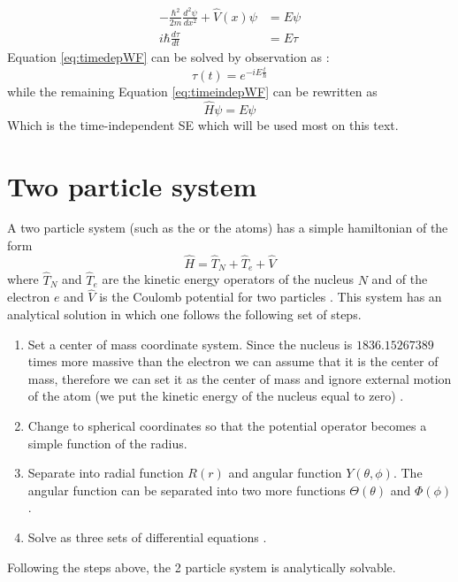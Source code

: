 \documentclass[../master_thesis.tex]{subfiles}
\begin{document}
\begin{subequations}
  \label{eq:sysSE}
  \begin{align}
    -\frac{\hbar^2}{2m}\frac{d^2\psi}{d x^2} + \hat{V}(x)\psi &= E\psi  \label{eq:timeindepWF}\\
    i\hbar\frac{d\tau}{d t} &= E\tau  \label{eq:timedepWF}
  \end{align}
\end{subequations}
Equation \ref{eq:timedepWF} can be solved by observation as \cite{Atkins:2011, Cohen:1973} :
\begin{equation}
  \tau(t) = e^{-iE\frac{t}{\hbar}}
\end{equation}
while the remaining Equation \ref{eq:timeindepWF} can be rewritten as
\begin{equation}
  \hat{H}\psi = E\psi\label{eq:timeindepSE}
\end{equation}
Which is the time-independent \ac{SE} which will be used most on this text.

\section{Two particle system}
A two particle system (such as the  or the  atoms) has a simple
hamiltonian of the form
\begin{equation}
  \hat{H}=\hat{T}_{N}+\hat{T}_{e}+\hat{V}
\end{equation}
where $\hat{T}_N$ and $\hat{T}_e$ are the kinetic energy operators of the nucleus $N$ and
of the electron $e$ and $\hat{V}$ is the Coulomb potential for two particles
\cite{Atkins:2014, Jensen:2017}.
This system has an analytical solution in which one follows the following set
of steps.
\begin{enumerate}
  \item Set a center of mass coordinate system. Since the nucleus is
  $1836.152 673 89$ times more massive than the electron \cite{NIST:2019} we can
  assume that it is the center of mass, therefore we can set it as the center of mass
  and ignore external motion of the atom (we put the kinetic energy of the
  nucleus equal to zero) \cite{Jensen:2017, Atkins:2011}.
  \item Change to spherical coordinates so that the potential operator becomes a
  simple function of the radius.
  \item Separate into radial function $R(r)$ and angular function
  $Y(\theta, \phi)$. The angular function can be separated into two more
  functions $\Theta(\theta)$ and $\Phi(\phi)$.
  \item Solve as three sets of differential equations \cite{Simons:2016}.
\end{enumerate}
Following the steps above, the 2 particle system is analytically solvable.
\end{document}
